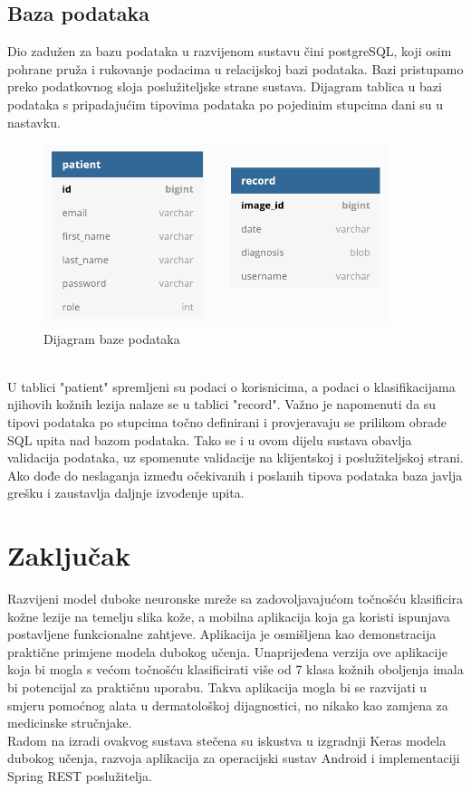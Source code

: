 \documentclass[times, utf8, zavrsni]{fer}
\begin{document}
\section{Baza podataka}
Dio zadužen za bazu podataka u razvijenom sustavu čini postgreSQL, koji osim pohrane pruža i rukovanje podacima u relacijskoj bazi podataka. Bazi pristupamo preko podatkovnog sloja poslužiteljske strane sustava. Dijagram tablica u bazi podataka s pripadajućim tipovima podataka po pojedinim stupcima dani su u nastavku.\\
%
\begin{figure}[!h]
\centering
\includegraphics[width=0.9\textwidth]{./slike/dijagram}
\caption{Dijagram baze podataka}
\label{fig:dijagram}
\end{figure}
%
\\
U tablici "patient" spremljeni su podaci o korisnicima, a podaci o klasifikacijama njihovih kožnih lezija nalaze se u tablici "record". Važno je napomenuti da su tipovi podataka po stupcima točno definirani i provjeravaju se prilikom obrade SQL upita nad bazom podataka. Tako se i u ovom dijelu sustava obavlja validacija podataka, uz spomenute validacije na klijentskoj i poslužiteljskoj strani. Ako dođe do neslaganja između očekivanih i poslanih tipova podataka baza javlja grešku i zaustavlja daljnje izvođenje upita.


\chapter{Zaključak}
Razvijeni model duboke neuronske mreže sa zadovoljavajućom točnošću klasificira kožne lezije na temelju slika kože, a mobilna aplikacija koja ga koristi ispunjava postavljene funkcionalne zahtjeve. Aplikacija je osmišljena kao demonstracija praktične primjene modela dubokog učenja. Unaprijeđena verzija ove aplikacije koja bi mogla s većom točnošću klasificirati više od 7 klasa kožnih oboljenja imala bi potencijal za praktičnu uporabu. Takva aplikacija mogla bi se razvijati u smjeru pomoćnog alata u dermatološkoj dijagnostici, no nikako kao zamjena za medicinske stručnjake.\\
%
\indent{}
Radom na izradi ovakvog sustava stečena su iskustva u izgradnji Keras modela dubokog učenja, razvoja aplikacija za operacijski sustav Android i implementaciji Spring REST poslužitelja. 
\end{document}
